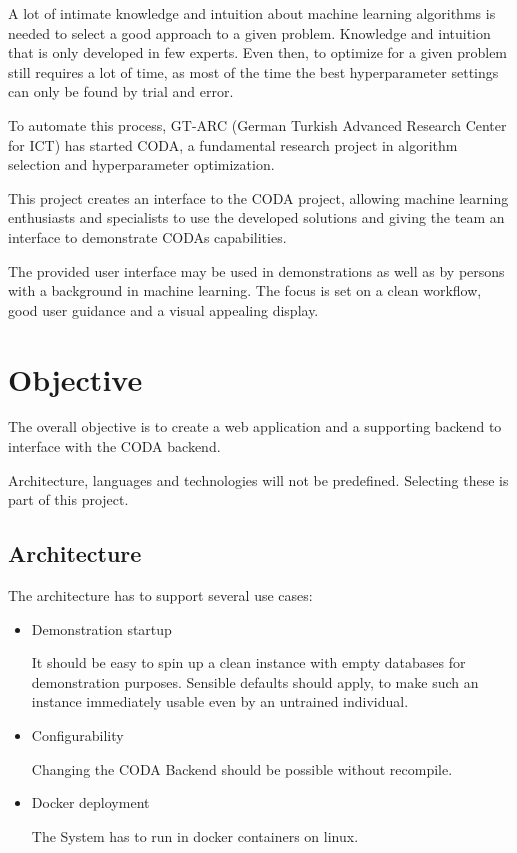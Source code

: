 \documentclass[12pt,a4paper,titlepage,oneside,BCOR1cm]{scrreprt}
\begin{document}
A lot of intimate knowledge and intuition about machine learning algorithms is needed to select a good approach to a given problem. Knowledge and intuition that is only developed in few experts. Even then, to optimize for a given problem still requires a lot of time, as most of the time the best hyperparameter settings can only be found by trial and error.

To automate this process, GT-ARC (German Turkish Advanced Research Center for ICT) has started CODA, a fundamental research project in algorithm selection and hyperparameter optimization. \cite{CODA-Steckbrief}

This project creates an interface to the CODA project, allowing machine learning enthusiasts and specialists to use the developed solutions and giving the team an interface to demonstrate CODAs capabilities.

The provided user interface may be used in demonstrations as well as by persons with a background in machine learning. The focus is set on a clean workflow, good user guidance and a visual appealing display.




\chapter{Objective}
The overall objective is to create a web application and a supporting backend to interface with the CODA backend. 

Architecture, languages and technologies will not be predefined. Selecting these is part of this project.

\section{Architecture}

The architecture has to support several use cases:
\begin{itemize}
  \item Demonstration startup
  
  It should be easy to spin up a clean instance with empty databases for demonstration purposes. Sensible defaults should apply, to make such an instance immediately usable even by an untrained individual.

  \item Configurability

  Changing the CODA Backend should be possible without recompile.

  \item Docker deployment

  The System has to run in docker containers on linux.

\end{itemize}
\end{document}
